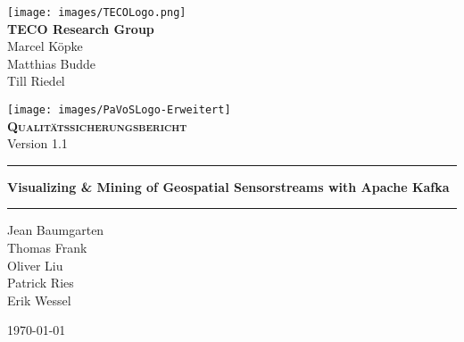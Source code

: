 \begin{titlepage}
	\begin{center}
	\texttt{[image: images/TECOLogo.png]}\\[0.2cm]

	\textbf{TECO Research Group}\\[0.2cm]
	Marcel Köpke\\Matthias Budde\\Till Riedel\\
	\vspace{1cm}
	
	\texttt{[image: images/PaVoSLogo-Erweitert]}\\[1cm]
	
	\textsc{\textbf{\LARGE Qualitätssicherungsbericht}}\\
	{\small Version 1.1}\\
	
	\vspace{1cm}\hrule\vspace{0.4cm}
	\textbf{\huge Visualizing \& Mining of Geospatial Sensorstreams with Apache Kafka}\\
	\vspace{0.4cm}\hrule\vspace{1cm}
	
	{\Large Jean Baumgarten\\
	Thomas Frank\\
	Oliver Liu\\
	Patrick Ries\\
	Erik Wessel\\}

	\vspace{1cm}
	\today
	
	\end{center}
\end{titlepage}